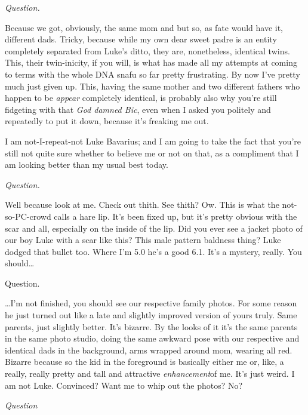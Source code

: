 {\em Question.}



Because we got, obviously, the same mom and but so, as fate would
have it, different dads. Tricky, because while my own dear sweet
padre is an entity completely separated from Luke's ditto,
they are, nonetheless, identical twins. This, their twin-inicity,
if you will, is what has made all my attempts at coming to terms
with the whole DNA snafu so far pretty frustrating. By now
I've pretty much just given up. This, having the same mother
and two different fathers who happen to be {\em appear} completely
identical, is probably also why you're still fidgeting with
that {\em God damned Bic}, even when I asked you politely and
repeatedly to put it down, because it's freaking me
out.

I am not-I-repeat-not Luke Bavarius; and I am going to take the
fact that you're still not quite sure whether to believe me
or not on that, as a compliment that I am looking better than my
usual best today.



{\em Question.}



Well because look at me. Check out thith. See thith? Ow. This is
what the not-so-PC-crowd calls a hare lip. It's been fixed
up, but it's pretty obvious with the scar and all, especially
on the inside of the lip. Did you ever see a jacket photo of our
boy Luke with a scar like this? This male pattern baldness thing?
Luke dodged that bullet too. Where I'm 5.0 he's a good
6.1. It's a mystery, really. You should{\ldots}



Question.



{\ldots}I'm not finished, you should see our respective
family photos. For some reason he just turned out like a late and
slightly improved version of yours truly. Same parents, just
slightly better. It's bizarre. By the looks of it it's
the same parents in the same photo studio, doing the same awkward
pose with our respective and identical dads in the background, arms
wrapped around mom, wearing all red. Bizarre because so the kid in
the foreground is basically either me or, like, a really, really
pretty and tall and attractive {\em enhancement}of me. It's
just weird. I am not Luke. Convinced? Want me to whip out the
photos? No?



{\em Question}



